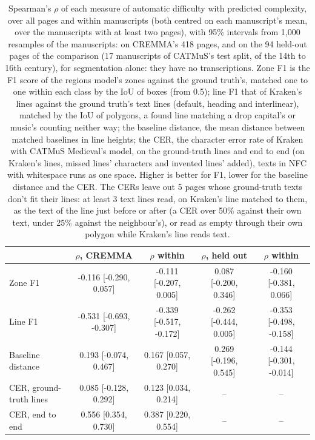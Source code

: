 \begin{table}[htbp]
  \centering
  \caption{Spearman's $\rho$ of each measure of automatic difficulty with predicted complexity, over all pages and within manuscripts (both centred on each manuscript's mean, over the manuscripts with at least two pages), with 95\% intervals from 1,000 resamples of the manuscripts: on CREMMA's 418 pages, and on the 94 held-out pages of the comparison (17 manuscripts of CATMuS's test split, of the 14th to 16th century), for segmentation alone: they have no transcriptions. Zone F1 is the F1 score of the regions model's zones against the ground truth's, matched one to one within each class by the IoU of boxes (from 0.5); line F1 that of Kraken's lines against the ground truth's text lines (default, heading and interlinear), matched by the IoU of polygons, a found line matching a drop capital's or music's counting neither way; the baseline distance, the mean distance between matched baselines in line heights; the CER, the character error rate of Kraken with CATMuS Medieval's model, on the ground-truth lines and end to end (on Kraken's lines, missed lines' characters and invented lines' added), texts in NFC with whitespace runs as one space. Higher is better for F1, lower for the baseline distance and the CER. The CERs leave out 5 pages whose ground-truth texts don't fit their lines: at least 3 text lines read, on Kraken's line matched to them, as the text of the line just before or after (a CER over 50\% against their own text, under 25\% against the neighbour's), or read as empty through their own polygon while Kraken's line reads text.}
  \label{tab:difficulty_correlations}
  \begin{tabular}{lcccc}
    \toprule
     & $\rho$, CREMMA & $\rho$ within & $\rho$, held out & $\rho$ within \\
    \midrule
    Zone F1 & -0.116 [-0.290, 0.057] & -0.111 [-0.207, 0.005] & 0.087 [-0.200, 0.346] & -0.160 [-0.381, 0.066] \\
    Line F1 & -0.531 [-0.693, -0.307] & -0.339 [-0.517, -0.172] & -0.262 [-0.444, 0.005] & -0.353 [-0.498, -0.158] \\
    Baseline distance & 0.193 [-0.074, 0.467] & 0.167 [0.057, 0.270] & 0.269 [-0.196, 0.545] & -0.144 [-0.301, -0.014] \\
    CER, ground-truth lines & 0.085 [-0.128, 0.292] & 0.123 [0.034, 0.214] & -- & -- \\
    CER, end to end & 0.556 [0.354, 0.730] & 0.387 [0.220, 0.554] & -- & -- \\
    \bottomrule
  \end{tabular}
\end{table}
